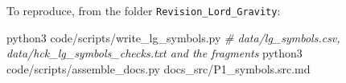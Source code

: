 \documentclass[
  10pt,
]{article}
\newenvironment{Shaded}{}{}
\newcommand{\CommentTok}[1]{\textcolor[rgb]{0.38,0.63,0.69}{\textit{#1}}}
\newcommand{\ExtensionTok}[1]{#1}
\newcommand{\NormalTok}[1]{#1}
\begin{document}
To reproduce, from the folder \texttt{Revision\_Lord\_Gravity}:

\begin{Shaded}
\begin{Highlighting}[]
\ExtensionTok{python3}\NormalTok{ code/scripts/write\_lg\_symbols.py      }\CommentTok{\# data/lg\_symbols.csv, data/hck\_lg\_symbols\_checks.txt and the fragments}
\ExtensionTok{python3}\NormalTok{ code/scripts/assemble\_docs.py docs\_src/P1\_symbols.src.md}
\end{Highlighting}
\end{Shaded}
\end{document}
